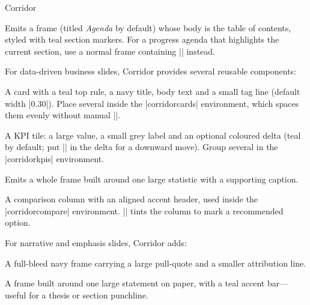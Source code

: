 \begin{themeexample}{Corridor}
  \begin{command}{\corridoragenda{}}
    Emits a frame (titled \emph{Agenda} by default) whose body is the table of contents, styled with teal section markers. For a progress agenda that highlights the current section, use a normal frame containing |\tableofcontents[currentsection]| instead.
  \end{command}

  For data-driven business slides, Corridor provides several reusable components:

  \begin{command}{\corridorcard{}}
    A card with a teal top rule, a navy title, body text and a small tag line (default width |0.30\textwidth|). Place several inside the |corridorcards| environment, which spaces them evenly without manual |\hfill|.
  \end{command}

  \begin{command}{\corridorkpi{}}
    A KPI tile: a large value, a small grey label and an optional coloured delta (teal by default; put |\color{corRed}| in the delta for a downward move). Group several in the |corridorkpis| environment.
  \end{command}

  \begin{command}{\corridorstat{}}
    Emits a whole frame built around one large statistic with a supporting caption.
  \end{command}

  \begin{command}{\corridorcompcol{}}
    A comparison column with an aligned accent header, used inside the |corridorcompare| environment. |\corridorcompcolhot| tints the column to mark a recommended option.
  \end{command}

  For narrative and emphasis slides, Corridor adds:

  \begin{command}{\corridorquote{}}
    A full-bleed navy frame carrying a large pull-quote and a smaller attribution line.
  \end{command}

  \begin{command}{\corridorstatement{}}
    A frame built around one large statement on paper, with a teal accent bar---useful for a thesis or section punchline.
  \end{command}


\end{themeexample}
